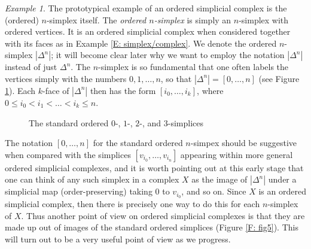 \documentclass[12pt]{article}
\theoremstyle{plain}
\theoremstyle{definition}
\theoremstyle{remark}
\newtheorem{example}[theorem]{Example}
\begin{document}
\begin{example}\label{E: n-simplex}
The prototypical example of an ordered simplicial complex is the (ordered) $n$-simplex itself\footnotemark. The \emph{ordered $n$-simplex} is simply an $n$-simplex with ordered vertices. It is an ordered simplicial complex when considered together with its faces as in Example \ref{E: simplex/complex}. We denote the ordered $n$-simplex $|\Delta^n|$; it will become clear later why we want to employ the notation $|\Delta^n|$ instead of just $\Delta^n$.  
The $n$-simplex is so fundamental that one often labels the vertices simply with the numbers $0,1,\ldots, n$, so that $|\Delta^n|=[0,\ldots,n]$ (see Figure \ref{F: fig2}). Each $k$-face of $|\Delta^n|$ then has the form $[i_0,\ldots, i_k]$, where $0\leq i_0<i_1<\ldots <i_k\leq n$. 



\begin{figure}[!htp]
\begin{center}
\end{center}
\caption{The standard ordered $0$-, $1$-, $2$-, and $3$-simplices}\label{F: fig2}
\end{figure}
\end{example}

The notation $[0,\ldots,n]$ for the standard ordered $n$-simpex should be suggestive when compared with the simplices $[v_{i_0},\ldots, v_{i_n}]$ appearing within more general ordered simplicial complexes, and it is worth pointing out at this early stage that one can think of any such simplex in a complex $X$ as the image of $|\Delta^n|$ under a  simplicial map (order-preserving) taking $0$ to $v_{i_0}$, and so on. Since $X$ is an ordered simplicial complex, then there is precisely one way to do this for each $n$-simplex of $X$.
Thus another point of view on ordered simplicial complexes is that they are made up out of images of the  standard ordered simplices (Figure \ref{F: fig5}). This will turn out to be a very useful point of view as we progress. 
\end{document}

